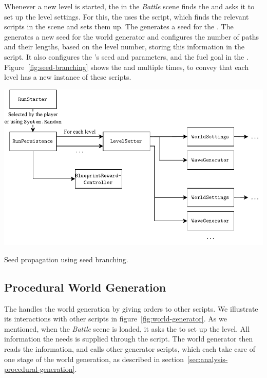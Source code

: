 Whenever a new level is started, the  in the \emph{Battle} scene finds the  and asks it to set up the level settings.
For this, the  uses the  script, which finds the relevant scripts in the scene and sets them up.
The  generates a seed for the .
The  generates a new seed for the world generator and configures the number of paths and their lengths, based on the level number, storing this information in the  script.
It also configures the 's seed and parameters, and the fuel goal in the .
Figure~\ref{fig:seed-branching} shows the  and  multiple times, to convey that each level has a new instance of these scripts.

\begin{center}
    \captionsetup{type=figure}
    \includegraphics[width=\textwidth]{img/seed splitting.pdf}
    \caption{Seed propagation using seed branching.}
    \label{fig:seed-branching}
\end{center}

\subsection{Procedural World Generation}\label{sec:docs-world-generation}

The  handles the world generation by giving orders to other scripts.
We illustrate its interactions with other scripts in figure~\ref{fig:world-generator}.
As we mentioned, when the \emph{Battle} scene is loaded, it asks the  to set up the level.
All information the  needs is supplied through the  script.
The world generator then reads the information, and calls other generator scripts, which each take care of one stage of the world generation, as described in section~\ref{sec:analysis-procedural-generation}.

